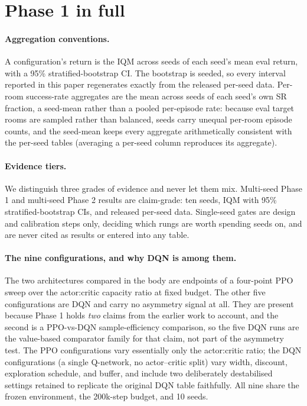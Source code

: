 
\section{Phase 1 in full}
\label{app:phase1}

\paragraph{Aggregation conventions.} A configuration's return is the IQM across seeds of each
seed's mean eval return, with a 95\% stratified-bootstrap CI. The bootstrap is seeded, so
every interval reported in this paper regenerates exactly from the released per-seed data.
Per-room success-rate aggregates are the mean across seeds of each seed's own SR fraction, a
seed-mean rather than a pooled per-episode rate: because eval target rooms are sampled rather
than balanced, seeds carry unequal per-room episode counts, and the seed-mean keeps every
aggregate arithmetically consistent with the per-seed tables (averaging a per-seed column
reproduces its aggregate).

\paragraph{Evidence tiers.} We distinguish three grades of evidence and never let them mix.
Multi-seed Phase 1 and multi-seed Phase 2 results are claim-grade: ten seeds, IQM with 95\%
stratified-bootstrap CIs, and released per-seed data. Single-seed gates are design and
calibration steps only, deciding which rungs are worth spending seeds on, and are never cited
as results or entered into any table.

\paragraph{The nine configurations, and why DQN is among them.} The two architectures compared
in the body are endpoints of a four-point PPO sweep over the actor:critic capacity ratio at
fixed budget. The other five configurations are DQN and carry no asymmetry signal at all. They
are present because Phase 1 holds \emph{two} claims from the earlier work to account, and the
second is a PPO-vs-DQN sample-efficiency comparison, so the five DQN runs are the value-based
comparator family for that claim, not part of the asymmetry test. The PPO configurations vary
essentially only the actor:critic ratio; the DQN configurations (a single Q-network, no
actor--critic split) vary width, discount, exploration schedule, and buffer, and include two
deliberately destabilised settings retained to replicate the original DQN table faithfully.
All nine share the frozen environment, the 200k-step budget, and 10 seeds.

